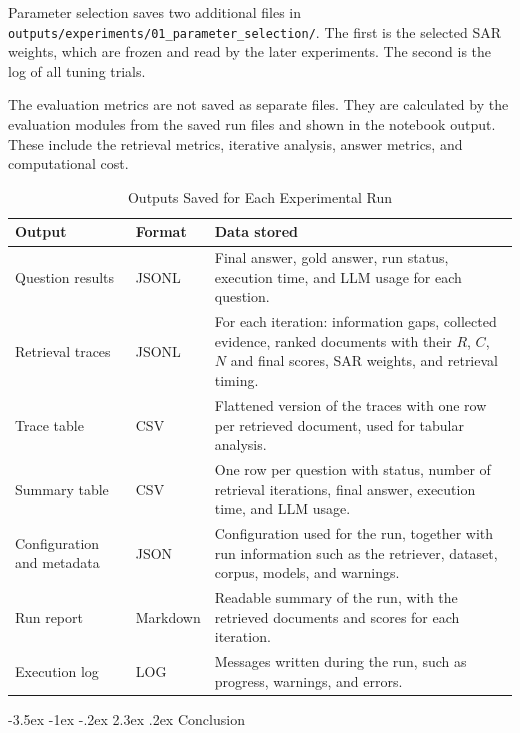 \documentclass[12pt,a4paper]{report}
\makeatletter
\renewcommand\section{\@startsection{section}{1}{\z@}%
    {-3.5ex \@plus -1ex \@minus -.2ex}%
    {2.3ex \@plus.2ex}%
    {\normalfont\fontsize{16}{19}\selectfont\bfseries}}
\makeatother
\begin{document}
Parameter selection saves two additional files in \texttt{outputs/experiments/01\_parameter\_selection/}. The first is the selected SAR weights, which are frozen and read by the later experiments. The second is the log of all tuning trials.

The evaluation metrics are not saved as separate files. They are calculated by the evaluation modules from the saved run files and shown in the notebook output. These include the retrieval metrics, iterative analysis, answer metrics, and computational cost.

\begin{table}[H]
\centering
\caption{Outputs Saved for Each Experimental Run}
\label{tab:impl-output-files}
\renewcommand{\arraystretch}{1.15}
\begin{tabular}{|p{1.45in}|p{0.95in}|p{3.7in}|}
\hline
\textbf{Output} & \textbf{Format} & \textbf{Data stored} \\
\hline
Question results & JSONL & Final answer, gold answer, run status, execution time, and LLM usage for each question. \\
\hline
Retrieval traces & JSONL & For each iteration: information gaps, collected evidence, ranked documents with their $R$, $C$, $N$ and final scores, SAR weights, and retrieval timing. \\
\hline
Trace table & CSV & Flattened version of the traces with one row per retrieved document, used for tabular analysis. \\
\hline
Summary table & CSV & One row per question with status, number of retrieval iterations, final answer, execution time, and LLM usage. \\
\hline
Configuration and metadata & JSON & Configuration used for the run, together with run information such as the retriever, dataset, corpus, models, and warnings. \\
\hline
Run report & Markdown & Readable summary of the run, with the retrieved documents and scores for each iteration. \\
\hline
Execution log & LOG & Messages written during the run, such as progress, warnings, and errors. \\
\hline
\end{tabular}
\end{table}


\section{Conclusion}
\end{document}
